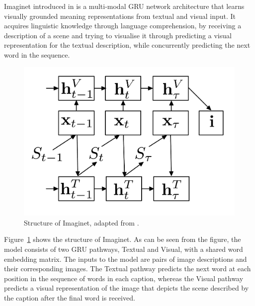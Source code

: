 {\sc Imaginet} introduced in \citep{chrupala2015learning} is a
multi-modal GRU network architecture that learns visually grounded
meaning representations from textual and visual input.  It acquires
linguistic knowledge through language comprehension, by receiving a
description of a scene and trying to visualise it through predicting a visual
representation for the textual description, while concurrently predicting
the next word in the sequence.

\begin{figure}
\begin{center}
\includegraphics[scale=0.2]{chapters/COLI/imaginet.pdf} 
\caption{Structure of {\sc Imaginet}, adapted from \protect\cite{chrupala2015learning}.}
\label{fig:imaginet}
\end{center}
\end{figure}

Figure~\ref{fig:imaginet} shows the structure of {\sc Imaginet}. As can
be seen from the figure, the model consists of two GRU pathways,
{\sc Textual} and {\sc Visual}, with a shared word embedding matrix.
The inputs to the model are pairs of image descriptions and their
corresponding images. The {\sc Textual} pathway predicts the next
word at each position in the sequence of words in each caption, whereas the
{\sc Visual} pathway predicts a visual representation of the image that depicts the
scene described by the caption after the final word is received.

